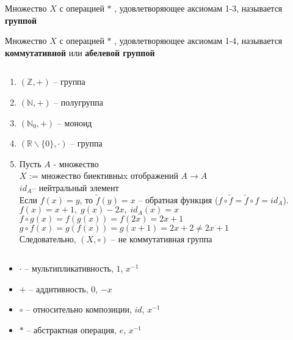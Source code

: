 \documentclass[12pt]{report}
\begin{document}
\begin{defn}
Множество $X$ с операцией $*$ , удовлетворяющее  аксиомам 1-3, называется {\bf группой}
\end{defn}

\begin{defn}
Множество $X$ с операцией $*$ , удовлетворяющее  аксиомам 1-4, называется {\bf коммутативной} или {\bf абелевой группой}
\end{defn}

\begin{exs}$ $
\begin{enumerate}
    \item $(\mathbb{Z}, + )$ -- группа
    \item $(\mathbb{N}, + )$ -- полугруппа
    \item $(\mathbb N_0 , +)$ -- моноид
    \item $(\mathbb R \backslash \{0\}, \cdot)$ -- группа
    \item Пусть $A$ - множество\\
	$X$ := множество биективныx отображений $A \to A$\\
	$id_A $-- нейтральный элемент\\
	Если $f(x) = y$, то $\tilde f (y) = x$ -- обратная функция ($f \circ \tilde f = \tilde f \circ f = id_A$).\\
	$f(x) = x+1,\; g(x) - 2x,\;id_A(x)=x$\\
	$f \circ g(x) = f(g(x)) = f(2x) = 2x + 1$\\
	$g \circ f(x) = g(f(x)) = g(x+1) = 2x + 2 \ne 2x+1$\\
	Следовательно, $(X, \circ)$ -- не коммутативная группа
\end{enumerate}
\end{exs}

\begin{name}$ $
\begin{itemize}
    \item $\cdot$ -- мультипликативность, $1$, $x^{-1}$
    \item $+$ -- аддитивность, $0$, $-x$
    \item $\circ$ -- относительно композиции, $id$, $x^{-1}$
    \item $*$ -- абстрактная операция, $e$, $x^{-1}$
\end{itemize}
\end{name}
\end{document}
